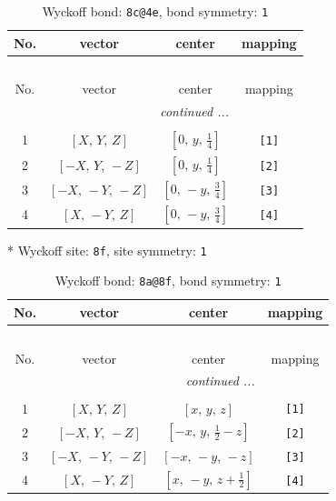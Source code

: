 \documentclass[fleqn,8pt]{jsarticle}
\begin{document}
\begin{longtable}{cccc}
\caption{Wyckoff bond: {\tt 8c@4e}, bond symmetry: {\tt 1}}
 \\
 \hline \hline
No. & vector & center & mapping \\ \hline \endfirsthead

\multicolumn{3}{l}{\tablename\ \thetable{}} \\
 \hline \hline
No. & vector & center & mapping \\ \hline \endhead

 \hline \hline
\multicolumn{3}{r}{\footnotesize\it continued ...} \\ \endfoot

 \hline \hline
\multicolumn{3}{r}{} \\ \endlastfoot

1 & $\left[ X,\, Y,\, Z \right]$ & $\left[ 0,\, y,\, \frac{1}{4} \right]$ & {\tt [1]} \\ \hline
2 & $\left[ - X,\, Y,\, - Z \right]$ & $\left[ 0,\, y,\, \frac{1}{4} \right]$ & {\tt [2]} \\ \hline
3 & $\left[ - X,\, - Y,\, - Z \right]$ & $\left[ 0,\, - y,\, \frac{3}{4} \right]$ & {\tt [3]} \\ \hline
4 & $\left[ X,\, - Y,\, Z \right]$ & $\left[ 0,\, - y,\, \frac{3}{4} \right]$ & {\tt [4]} \\
\end{longtable}
* Wyckoff site: {\tt 8f}, site symmetry: {\tt 1}
\renewcommand{\arraystretch}{1.2}
\begin{longtable}{cccc}
\caption{Wyckoff bond: {\tt 8a@8f}, bond symmetry: {\tt 1}}
 \\
 \hline \hline
No. & vector & center & mapping \\ \hline \endfirsthead

\multicolumn{3}{l}{\tablename\ \thetable{}} \\
 \hline \hline
No. & vector & center & mapping \\ \hline \endhead

 \hline \hline
\multicolumn{3}{r}{\footnotesize\it continued ...} \\ \endfoot

 \hline \hline
\multicolumn{3}{r}{} \\ \endlastfoot

1 & $\left[ X,\, Y,\, Z \right]$ & $\left[ x,\, y,\, z \right]$ & {\tt [1]} \\ \hline
2 & $\left[ - X,\, Y,\, - Z \right]$ & $\left[ - x,\, y,\, \frac{1}{2} - z \right]$ & {\tt [2]} \\ \hline
3 & $\left[ - X,\, - Y,\, - Z \right]$ & $\left[ - x,\, - y,\, - z \right]$ & {\tt [3]} \\ \hline
4 & $\left[ X,\, - Y,\, Z \right]$ & $\left[ x,\, - y,\, z + \frac{1}{2} \right]$ & {\tt [4]} \\
\end{longtable}
\end{document}
